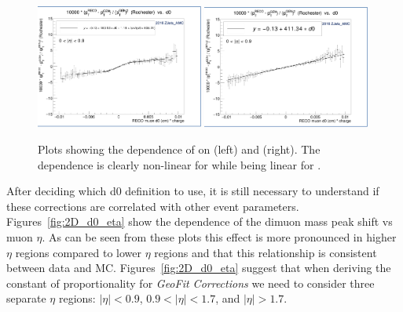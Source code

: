 \begin{figure}[h!]
    \centering
    \includegraphics[width=0.49\textwidth]{images_geofit/d0_PV_dpTOverpT2_inclusive.png}
    \includegraphics[width=0.49\textwidth]{images_geofit/d0_BS_dpTOverpT2_inclusive.png}
    \caption{Plots showing the dependence of \dptoverptsquare on \dzeroPV (left) and \dzeroBS (right). The dependence is clearly non-linear for \dzeroPV while being linear for \dzeroBS.}
    \label{fig:d0_dpTOverpT2_inclusive}
\end{figure}

After deciding which d0 definition to use, it is still necessary to understand if these corrections are correlated with other event parameters. Figures~\ref{fig:2D_d0_eta} show the dependence of the dimuon mass peak shift vs muon $\eta$. As can be seen from these plots this effect is more pronounced in higher $\eta$ regions compared to lower $\eta$ regions and that this relationship is consistent between data and MC. Figures~\ref{fig:2D_d0_eta} suggest that when deriving the constant of proportionality for \textit{GeoFit Corrections} we need to consider three separate $\eta$ regions: $|\eta| < 0.9$, $0.9 < |\eta| < 1.7$, and $|\eta| > 1.7$.  


